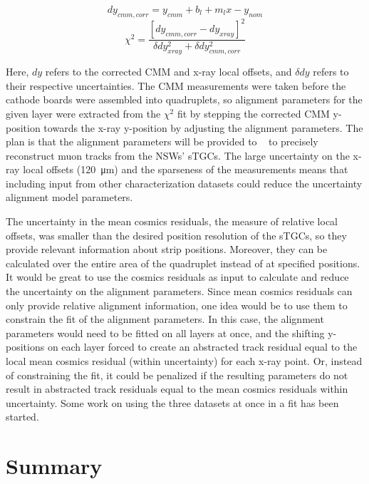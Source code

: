 \begin{equation}
    dy_{cmm, corr} = y_{cmm} + b_l + m_{l}x - y_{nom}
    \label{eqn:dy_cmm_corr}
\end{equation}
\begin{equation}
    \chi^2 = \frac{\left[dy_{cmm, corr} - dy_{xray}\right]^2}{\delta dy_{xray}^2 + \delta dy_{cmm, corr}^2}
    \label{eqn:chi2}  
\end{equation}

Here, $dy$ refers to the corrected CMM and x-ray local offsets, and $\delta dy$ refers to their respective uncertainties. The CMM measurements were taken before the cathode boards were assembled into quadruplets, so alignment parameters for the given layer were extracted from the $\chi^2$ fit by stepping the corrected CMM y-position towards the x-ray y-position by adjusting the alignment parameters. The plan is that the alignment parameters will be provided to ~\cite{the_atlas_collaboration_athena} to precisely reconstruct muon tracks from the NSWs' sTGCs. The large uncertainty on the x-ray local offsets (\SI{120}{\micro\meter}) and the sparseness of the measurements means that including input from other characterization datasets could reduce the uncertainty alignment model parameters. 

The uncertainty in the mean cosmics residuals, the measure of relative local offsets, was smaller than the desired position resolution of the sTGCs, so they provide relevant information about strip positions. Moreover, they can be calculated over the entire area of the quadruplet instead of at specified positions. It would be great to use the cosmics residuals as input to calculate and reduce the uncertainty on the alignment parameters. Since mean cosmics residuals can only provide relative alignment information, one idea would be to use them to constrain the fit of the alignment parameters. In this case, the alignment parameters would need to be fitted on all layers at once, and the shifting y-positions on each layer forced to create an abstracted track residual equal to the local mean cosmics residual (within uncertainty) for each x-ray point. Or, instead of constraining the fit, it could be penalized if the resulting parameters do not result in abstracted track residuals equal to the mean cosmics residuals within uncertainty. Some work on using the three datasets at once in a fit has been started.

\section{Summary}
\label{sec:summary}

